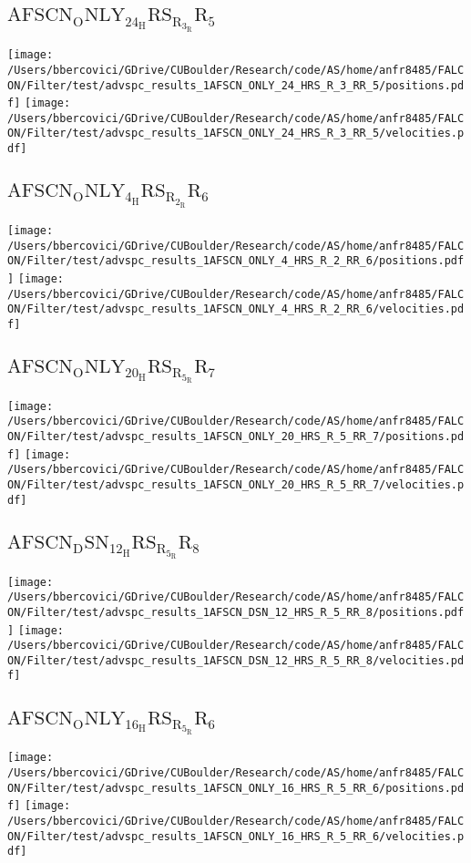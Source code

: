 \subsection{$\mathrm{AFSCN_ONLY_24_HRS_R_3_RR_5}$}
\texttt{[image: /Users/bbercovici/GDrive/CUBoulder/Research/code/AS/home/anfr8485/FALCON/Filter/test/advspc\_results\_1AFSCN\_ONLY\_24\_HRS\_R\_3\_RR\_5/positions.pdf]}
\texttt{[image: /Users/bbercovici/GDrive/CUBoulder/Research/code/AS/home/anfr8485/FALCON/Filter/test/advspc\_results\_1AFSCN\_ONLY\_24\_HRS\_R\_3\_RR\_5/velocities.pdf]}
\subsection{$\mathrm{AFSCN_ONLY_4_HRS_R_2_RR_6}$}
\texttt{[image: /Users/bbercovici/GDrive/CUBoulder/Research/code/AS/home/anfr8485/FALCON/Filter/test/advspc\_results\_1AFSCN\_ONLY\_4\_HRS\_R\_2\_RR\_6/positions.pdf]}
\texttt{[image: /Users/bbercovici/GDrive/CUBoulder/Research/code/AS/home/anfr8485/FALCON/Filter/test/advspc\_results\_1AFSCN\_ONLY\_4\_HRS\_R\_2\_RR\_6/velocities.pdf]}
\subsection{$\mathrm{AFSCN_ONLY_20_HRS_R_5_RR_7}$}
\texttt{[image: /Users/bbercovici/GDrive/CUBoulder/Research/code/AS/home/anfr8485/FALCON/Filter/test/advspc\_results\_1AFSCN\_ONLY\_20\_HRS\_R\_5\_RR\_7/positions.pdf]}
\texttt{[image: /Users/bbercovici/GDrive/CUBoulder/Research/code/AS/home/anfr8485/FALCON/Filter/test/advspc\_results\_1AFSCN\_ONLY\_20\_HRS\_R\_5\_RR\_7/velocities.pdf]}
\subsection{$\mathrm{AFSCN_DSN_12_HRS_R_5_RR_8}$}
\texttt{[image: /Users/bbercovici/GDrive/CUBoulder/Research/code/AS/home/anfr8485/FALCON/Filter/test/advspc\_results\_1AFSCN\_DSN\_12\_HRS\_R\_5\_RR\_8/positions.pdf]}
\texttt{[image: /Users/bbercovici/GDrive/CUBoulder/Research/code/AS/home/anfr8485/FALCON/Filter/test/advspc\_results\_1AFSCN\_DSN\_12\_HRS\_R\_5\_RR\_8/velocities.pdf]}
\subsection{$\mathrm{AFSCN_ONLY_16_HRS_R_5_RR_6}$}
\texttt{[image: /Users/bbercovici/GDrive/CUBoulder/Research/code/AS/home/anfr8485/FALCON/Filter/test/advspc\_results\_1AFSCN\_ONLY\_16\_HRS\_R\_5\_RR\_6/positions.pdf]}
\texttt{[image: /Users/bbercovici/GDrive/CUBoulder/Research/code/AS/home/anfr8485/FALCON/Filter/test/advspc\_results\_1AFSCN\_ONLY\_16\_HRS\_R\_5\_RR\_6/velocities.pdf]}
